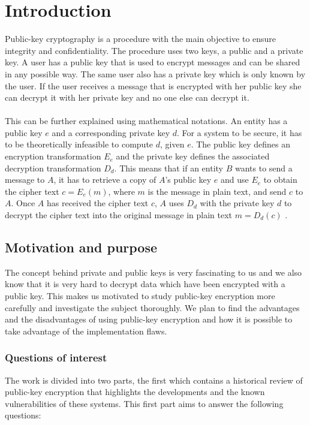 \documentclass[frame, english]{idamasterthesis}
\author{Tomas Melin and
    Tomas Vidhall
    }
\begin{document}
\small




\makeintropages

\chapter{Introduction}
\chaptermark{}
Public-key cryptography is a procedure with the main objective to ensure integrity and
confidentiality. The procedure uses two keys, a public and a private key. A user has a public key that is used to encrypt messages and can be shared in any possible way. The same user also has a private key which is only known by the user. If the user receives a message that is encrypted with her public key she can decrypt it with her private key and no one else can decrypt it. \\\\
This can be further explained using mathematical notations. An entity has a public key $e$ and a corresponding private key $d$. For a system to be secure, it has to be theoretically infeasible to compute $d$, given $e$. The public key defines an encryption transformation $E_e$ and the private key defines the associated decryption transformation $D_d$. This means that if an entity $B$ wants to send a message to $A$, it has to retrieve a copy of $A$'s public key $e$ and use $E_e$ to obtain the cipher text $c=E_e(m)$, where $m$ is the message in plain text, and send $c$ to $A$. Once $A$ has received the cipher text $c$, $A$ uses $D_d$ with the private key $d$ to decrypt the cipher text into the original message in plain text $m=D_d(c)$ \cite{handcrypt}.

\section{Motivation and purpose}
The concept behind private and public keys is very fascinating to us and we also know that it is very hard to decrypt data which have been encrypted with a public key. This makes us motivated to study public-key encryption more carefully and investigate the subject thoroughly. We plan to find the advantages and the disadvantages of using public-key encryption and how it is possible to take advantage of the implementation flaws.

\subsection{Questions of interest}
The work is divided into two parts, the first which contains a historical review of public-key encryption that highlights the developments and the known vulnerabilities of these systems. This first part aims to answer the following questions:
\end{document}
